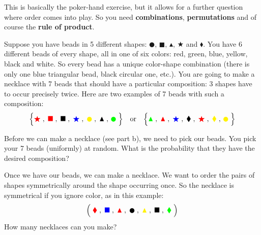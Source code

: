 \documentclass[a4paper,10pt,landscape,twocolumn]{scrartcl}
\begin{document}
\begin{exercise}[Necklaces (4pt)]
	\begin{mycomment}
		This is basically the poker-hand exercise, but it allows for a further question where order comes into play. So you need \textbf{combinations}, \textbf{permutations} and of course the \textbf{rule of product}. 
	\end{mycomment}
	
	Suppose you have beads in 5 different shapes: $\CIRCLE$, $\blacksquare$, $\blacktriangle$, $\bigstar$ and $\blacklozenge$. You have 6 different beads of every shape, all in one of six colors: red, green, blue, yellow, black and white. So every bead has a unique color-shape combination (there is only one blue triangular bead, black circular one, etc.). You are going to make a necklace with 7 beads that should have a particular composition: 3 shapes have to occur precisely twice. Here are two examples of 7 beads with such a composition:
		\[
			\Bigr \{ {\color{red}\bigstar}
					\;, \; {\color{red} \blacksquare}
					\;, \; \blacksquare
					\;, \; {\color{blue}\bigstar}
					\;, \; {\color{yellow} \CIRCLE}
					\;, \; \blacktriangle
					\;, \, {\color{green}\CIRCLE}
			 \; \Bigl\}
			\quad \mathrm{or} \quad
			\Bigr \{ {\color{green}\blacktriangle} 
					\;, \; {\color{red} \blacktriangle}
					\;, \; {\color{blue}\bigstar}
					\;,\; \blacklozenge
					\;, \; {\color{red}\bigstar}
					\;, \; {\color{yellow} \blacklozenge}
					\;, \, {\color{yellow}\CIRCLE} 
			\; \Bigl\}
		\]

	\begin{subex}[3pt]
		Before we can make a necklace (see part b), we need to pick our beads. You pick your 7 beads (uniformly) at random. What is the probability that they have the desired composition?
	\end{subex}
	
	\begin{subex}[1pt]
		Once we have our beads, we can make a necklace. We want to order the pairs of shapes symmetrically around the shape occurring once. So the necklace is symmetrical if you ignore color, as in this example:
		\[	
		\Bigl (\; {\color{red}\blacklozenge}
			\;,\; {\color{blue}\blacksquare}
			\;,\; {\color{red}\blacktriangle}
			\;,\; {\color{black}\CIRCLE}
			\;,\; {\color{yellow}\blacktriangle}
			\;,\; {\color{black}\blacksquare}
			\;,\; {\color{green}\blacklozenge}
		\; \Bigr)
		\]
		How many necklaces can you make?
	\end{subex}
\end{exercise}
\end{document}
